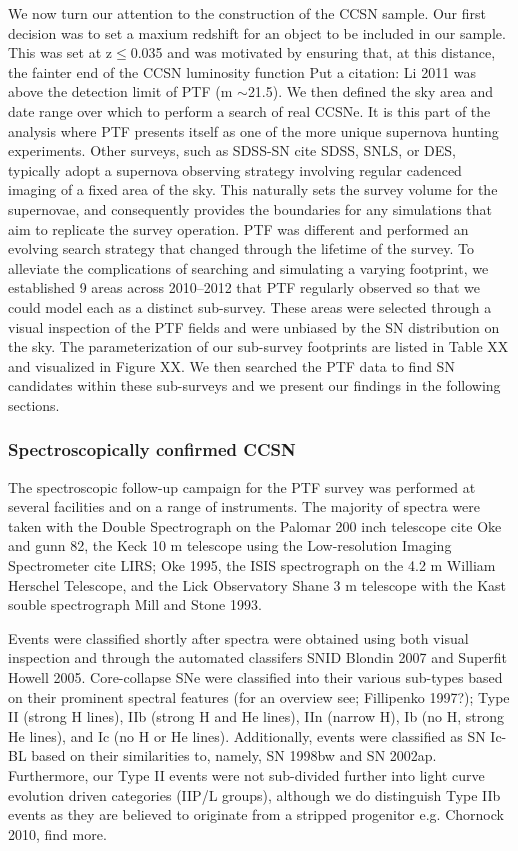 \documentclass[a4paper,fleqn,usenatbib]{mnras}
\newcommand{\chris}[1]{\color{orange}#1\color{black}}
\begin{document}
We now turn our attention to the construction of the CCSN sample. Our first decision was to set a maxium redshift for an object to be included in our sample. This was set at z${\le}$0.035 and was motivated by ensuring that, at this distance, the fainter end of the CCSN luminosity function \chris{Put a citation: Li 2011} was above the detection limit of PTF (m ${\sim}$21.5). We then defined the sky area and date range over which to perform a search of real CCSNe. It is this part of the analysis where PTF presents itself as one of the more unique supernova hunting experiments. Other surveys, such as SDSS-SN \chris{cite SDSS}, \chris{SNLS}, or \chris{DES}, typically adopt a supernova observing strategy involving regular cadenced imaging of a fixed area of the sky. This naturally sets the survey volume for the supernovae, and consequently provides the boundaries for any simulations that aim to replicate the survey operation. PTF was different and performed an evolving search strategy that changed through the lifetime of the survey. To alleviate the complications of searching and simulating a varying footprint, we established 9 areas across 2010--2012 that PTF regularly observed so that we could model each as a distinct sub-survey. These areas were selected through a visual inspection of the PTF fields and were unbiased by the SN distribution on the sky. The parameterization of our sub-survey footprints are listed in Table XX and visualized in Figure XX. We then searched the PTF data to find SN candidates within these sub-surveys and we present our findings in the following sections.

\subsubsection{Spectroscopically confirmed CCSN}
\label{sec:spec_CC}

The spectroscopic follow-up campaign for the PTF survey was performed at several facilities and on a range of instruments. The majority of spectra were taken with the Double Spectrograph on the Palomar 200 inch telescope \chris{cite Oke and gunn 82}, the Keck 10 m telescope using the Low-resolution Imaging Spectrometer \chris{cite LIRS; Oke 1995}, the ISIS spectrograph on the 4.2 m William Herschel Telescope, and the Lick Observatory Shane 3 m telescope with the Kast souble spectrograph \chris{Mill and Stone 1993}.

Events were classified shortly after spectra were obtained using both visual inspection and through the automated classifers SNID \chris{Blondin 2007} and Superfit \chris{Howell 2005}. Core-collapse SNe were classified into their various sub-types based on their prominent spectral features (for an overview see; \chris{Fillipenko 1997?}); Type II (strong H lines), IIb (strong H and He lines), IIn (narrow H), Ib (no H, strong He lines), and Ic (no H or He lines). Additionally, events were classified as SN Ic-BL based on their similarities to, namely, SN 1998bw and SN 2002ap. Furthermore, our Type II events were not sub-divided further into light curve evolution driven categories (IIP/L groups), although we do distinguish Type IIb events as they are believed to originate from a stripped progenitor \chris{e.g. Chornock 2010, find more}.
\end{document}
